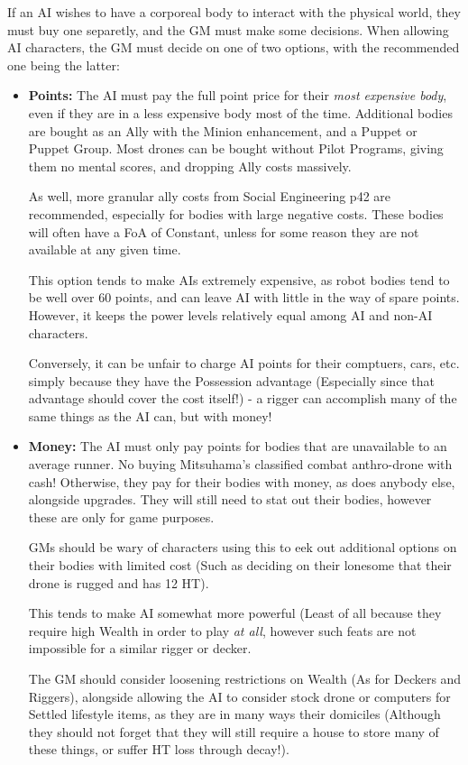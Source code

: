\begin{multicols*}{3}
	If an AI wishes to have a corporeal body to interact with the physical world, they must buy one separetly, and the GM must make some decisions. When allowing AI characters, the GM must decide on one of two options, with the recommended one being the latter:
	\begin{itemize}
		\item \textbf{Points: } The AI must pay the full point price for their \textit{most expensive body}, even if they are in a less expensive body most of the time. Additional bodies are bought as an Ally with the Minion enhancement, and a Puppet or Puppet Group. Most drones can be bought without Pilot Programs, giving them no mental scores, and dropping Ally costs massively. 
		
		As well, more granular ally costs from Social Engineering p42 are recommended, especially for bodies with large negative costs. These bodies will often have a FoA of Constant, unless for some reason they are not available at any given time. 
		
		This option tends to make AIs extremely expensive, as robot bodies tend to be well over 60 points, and can leave AI with little in the way of spare points. However, it keeps the power levels relatively equal among AI and non-AI characters. 
		
		Conversely, it can be unfair to charge AI points for their comptuers, cars, etc. simply because they have the Possession advantage (Especially since that advantage should cover the cost itself!) - a rigger can accomplish many of the same things as the AI can, but with money!
		
		\item \textbf{Money: } The AI must only pay points for bodies that are unavailable to an average runner. No buying Mitsuhama's classified combat anthro-drone with cash! Otherwise, they pay for their bodies with money, as does anybody else, alongside upgrades. They will still need to stat out their bodies, however these are only for game purposes. 
		
		GMs should be wary of characters using this to eek out additional options on their bodies with limited cost (Such as deciding on their lonesome that their drone is rugged and has 12 HT). 
		
		This tends to make AI somewhat more powerful (Least of all because they require high Wealth in order to play \textit{at all}, however such feats are not impossible for a similar rigger or decker. 
		
		The GM should consider loosening restrictions on Wealth (As for Deckers and Riggers), alongside allowing the AI to consider stock drone or computers for Settled lifestyle items, as they are in many ways their domiciles (Although they should not forget that they will still require a house to store many of these things, or suffer HT loss through decay!).
		

\end{itemize}
\end{multicols*}
